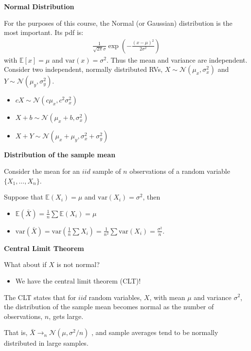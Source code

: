 \documentclass[12pt,xcolor=svgnames]{beamer}
\newcommand{\rd}{\color{red}}
\newcommand{\bl}{\color{blue}}
\newcommand{\theme}{\color{FireBrick}}
\newcommand{\mc}[1]{\mathcal{#1}}
\newcommand{\ds}[1]{\mathds{#1}}
\newcommand{\sk}{\vspace{.4cm}}
\newcommand{\chap}[1]{{\theme \Large \bf #1} \sk}
\newcommand{\E}{\ds{E}}
\newcommand{\var}{\text{var}}
\newcommand{\mN}{\mc{N}}
\begin{document}
\begin{frame}
\chap{Normal Distribution}

For the purposes of this course, the {\bl Normal} (or Gaussian) distribution is the most important. Its pdf is:
\begin{align*}
\frac{1}{\sqrt{2\pi}\sigma}\exp{\left(-\frac{(x-\mu)^2}{2\sigma^2}\right)}
\end{align*}
with $\E[x]=\mu$ and $\var(x)=\sigma^2$. Thus the mean and variance are independent. Consider two independent, normally distributed RVs, $X \sim \mN( \mu_x ,\sigma_x^2)$ and $Y \sim \mN( \mu_y ,\sigma_y^2)$. 

\begin{itemize}
\item $cX \sim \mN( c \mu_x , c^2 \sigma_x^2)$
\item $X+b \sim \mN( \mu_x + b , \sigma_x^2)$
\item $X + Y  \sim \mN( \mu_x + \mu_y ,\sigma_x^2 + \sigma_y^2)$
\end{itemize}



\end{frame}



\begin{frame}
\chap{Distribution of the sample mean} 

\sk
Consider
the mean for an $iid$ sample of $n$
observations of a  random variable
$\{X_1,\ldots,X_n\}$.

\sk 
Suppose that $\ds{E}(X_i)  = \mu$ and $\var(X_i) = \sigma^2$, then
\sk
\begin{itemize}
\item $\ds{E}(\bar{X}) = \frac{1}{n} \sum\ds{E}(X_i) = \mu$
\item $\var(\bar{X}) = \var\left( \frac{1}{n} \sum X_i \right) 
=  \frac{1}{n^2} \sum \var\left(  X_i \right) = \displaystyle
\frac{\sigma^2}{n}$.
\end{itemize}

\sk{\bl  If $X$ is normal, then $\bar{X} \sim \mN\left( \mu ,
  \frac{\sigma^2}{n} \right)$. }

\end{frame}

\iffalse

\begin{frame}
\chap{Central Limit Theorem}

What about if $X$ is not normal?
\begin{itemize}
\item {\rd We have the central limit theorem (CLT)! }
\end{itemize}

\sk
The CLT states that for $iid$ random
variables, $X$, with mean $\mu$ and variance $\sigma^2$,
the distribution of the sample mean 
becomes normal as the number of
observations, $n$, gets large. 

\sk That is, {\rd $\displaystyle \bar{X} \rightarrow_{n}
\mN(\mu, \sigma^2/n)$} , and sample averages tend to be
normally distributed in large samples.
\end{frame}
\end{document}
